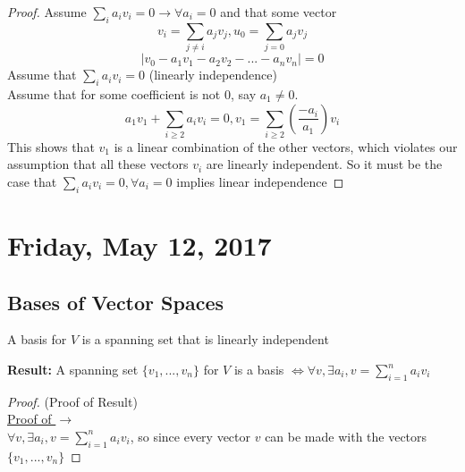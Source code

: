 \documentclass[12pt]{article}
\begin{document}
\begin{proof}
	Assume $\sum_i a_i v_i = 0 \longrightarrow \forall a_i = 0$ and that some vector
	$$v_i = \sum_{j \neq i} a_j v_j, u_0 = \sum_{j = 0} a_j v_j$$
	$$|v_0 - a_1 v_1 - a_2 v_2 - ... - a_n v_n| = 0$$
	Assume that $\sum_i a_i v_i = 0$ (linearly independence)\\
	Assume that for some coefficient is not 0, say $a_1 \neq 0$.\\
	$$a_1 v_1 + \sum_{i\geq 2} a_i v_i = 0, v_1 = \sum_{i\geq 2} (\frac{-a_i}{a_1}) v_i$$
	This shows that $v_1$ is a linear combination of the other vectors, which violates our assumption that all these vectors $v_i$ are linearly independent. So it must be the case that $\sum_i a_i v_i = 0, \forall a_i = 0$ implies linear independence
\end{proof}

\newpage

\section{Friday, May 12, 2017}

\subsection{Bases of Vector Spaces}

\begin{tcolorbox}[title=Definition: A Basis of Vector Spaces]
	A basis for $V$ is a spanning set that is linearly independent
\end{tcolorbox}

\textbf{Result:} A spanning set $\{v_1, ..., v_n \}$ for $V$ is a basis $\Longleftrightarrow \forall v, \exists a_i, v = \sum^n_{i = 1} a_i v_i$

\begin{proof}(Proof of Result)\\
	\underline{Proof of $\longrightarrow$}\\
	$\forall v, \exists a_i, v = \sum^n_{i = 1} a_i v_i$, so since every vector $v$ can be made with the vectors $\{v_1, ..., v_n \}$ 
\end{proof}
\end{document}
